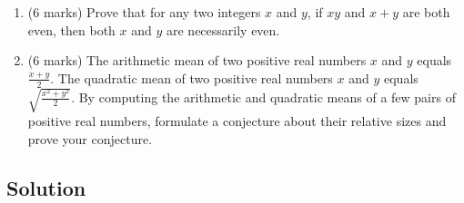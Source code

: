 \documentclass{article}
\begin{document}
\begin{enumerate}[label=\alph*.]
    \item (6 marks) Prove that for any two integers \( x \) and \( y \), if \( xy \) and \( x + y \) are both even, then both \( x \) and \( y \) are necessarily even.
    \item (6 marks) The arithmetic mean of two positive real numbers \( x \) and \( y \) equals \( \frac{x + y}{2} \). The quadratic mean of two positive real numbers \( x \) and \( y \) equals \( \sqrt{\frac{x^2 + y^2}{2}} \). By computing the arithmetic and quadratic means of a few pairs of positive real numbers, formulate a conjecture about their relative sizes and prove your conjecture.
\end{enumerate}

\subsection*{Solution}
\end{document}
